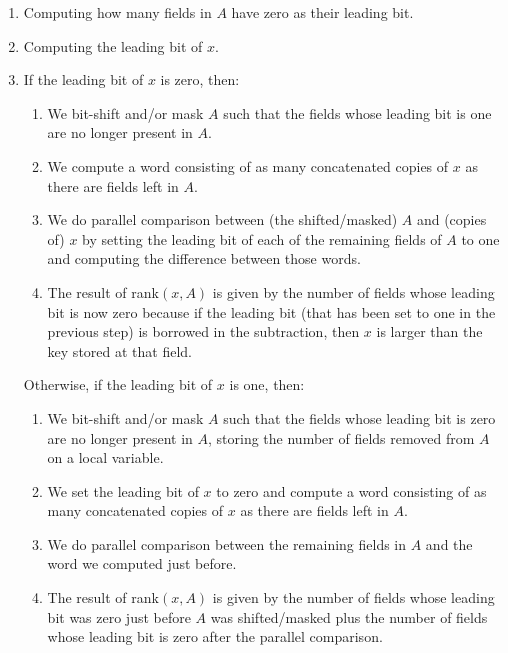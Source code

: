 \begin{enumerate}
    \item
    Computing how many fields in $A$ have zero as their leading bit.
    
    \item
    Computing the leading bit of $x$.
    
    \item
    If the leading bit of $x$ is zero, then:
    \begin{enumerate}
        \item
        We bit-shift and/or mask $A$ such that the fields whose leading bit is one are no longer present in $A$.
        
        \item
        We compute a word consisting of as many concatenated copies of $x$ as there are fields left in $A$.
        
        \item
        We do parallel comparison between (the shifted/masked) $A$ and (copies of) $x$ by setting the leading bit of each of the remaining fields of $A$ to one and computing the difference between those words.
        
        \item
        The result of rank$(x,A)$ is given by the number of fields whose leading bit is now zero because if the leading bit (that has been set to one in the previous step) is borrowed in the subtraction, then $x$ is larger than the key stored at that field.
    \end{enumerate}
    
    Otherwise, if the leading bit of $x$ is one, then:
    \begin{enumerate}
        \item
        We bit-shift and/or mask $A$ such that the fields whose leading bit is zero are no longer present in $A$, storing the number of fields removed from $A$ on a local variable.
        
        \item
		We set the leading bit of $x$ to zero and compute a word consisting of as many concatenated copies of $x$ as there are fields left in $A$.
		
		\item
        We do parallel comparison between the remaining fields in $A$ and the word we computed just before.
        
        \item
        The result of rank$(x,A)$ is given by the number of fields whose leading bit was zero just before $A$ was shifted/masked plus the number of fields whose leading bit is zero after the parallel comparison.
    \end{enumerate}
    
\end{enumerate}

